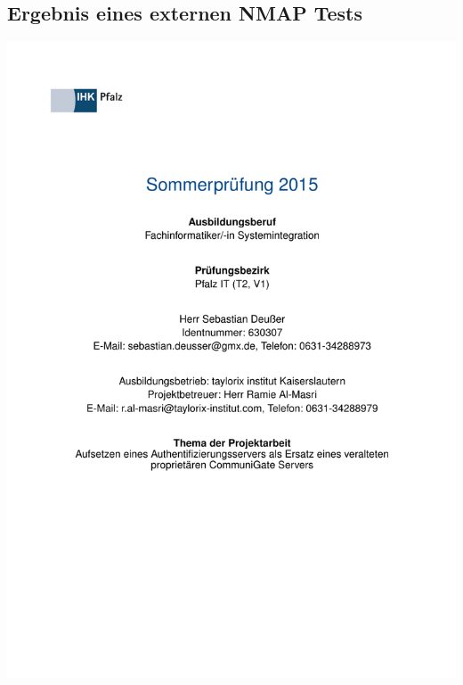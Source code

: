 \documentclass[11pt,a4paper,titlepage=firstiscover,headsepline,bibtotoc]{scrartcl} %
\begin{document}
\newpage
\subsection{Ergebnis eines externen NMAP Tests}\label{sec:NMAP-Test-ext}

\newpage


\clearpage






\includegraphics{1_Projektantrag_(abgelehnt).pdf}
\end{document}

